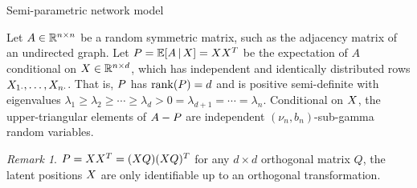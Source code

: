 \documentclass[aspectratio=169]{beamer}
\theoremstyle{remark}
\newtheorem*{remark}{Remark}
\begin{document}









\begin{frame}{Semi-parametric network model}
    \begin{definition}
        Let $A \in \mathbb{R}^{n \times n}$ be a random symmetric matrix, such as the adjacency matrix of an undirected graph. Let $\Apop = \E[\X]{A} = \X \X^T$ be the expectation of $A$ conditional on $X \in \mathbb{R}^{n \times d}$, which has independent and identically distributed rows $X_{1 \cdot}, \dots, X_{n \cdot}$. That is, $P$ has $\rank \paren*{\Apop} = d$ and is positive semi-definite with eigenvalues $\lambda_1 \ge \lambda_2 \ge \cdots \ge \lambda_d > 0 = \lambda_{d+1} = \cdots = \lambda_n$. Conditional on $X$, the upper-triangular elements of $A - P$ are independent $(\nu_n, b_n)$-sub-gamma random variables.
    \end{definition}
    \begin{remark}
        $P = X X^T = (X Q) (X Q)^T$ for any $d \times d$ orthogonal matrix $Q$, the latent positions $X$ are only identifiable up to an orthogonal transformation.
    \end{remark}
\end{frame}
\end{document}

